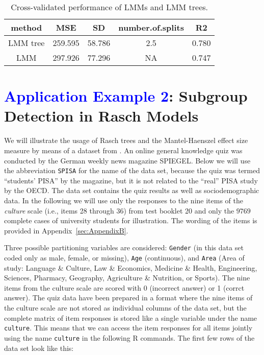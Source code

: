 \documentclass[doc,floatsintext,natbib]{apa7}
\newcommand{\edc}[1]{\textcolor{blue}{#1}}
\begin{document}
\begin{table}

\caption{\label{tab:performance}Cross-validated performance of LMMs and LMM trees.}
\begin{tabular}[t]{ccccc}
\toprule
method & MSE & SD & number.of.splits & R2\\
\midrule
LMM tree & 259.595 & 58.786 & 2.5 & 0.780\\
LMM & 297.926 & 77.296 & NA & 0.747\\
\bottomrule
\end{tabular}
\end{table}



\newpage
\FloatBarrier
\section{\edc{Application Example 2}: Subgroup Detection in Rasch Models}
\label{sec:TutorialRasch}


We will illustrate the usage of Rasch trees and the Mantel-Haenszel effect size measure by means of a dataset from \citet{SPISA:book}. An online general knowledge quiz was conducted by the German
weekly news magazine SPIEGEL. Below we will use the abbreviation \texttt{SPISA} for the name of the data set, because the quiz was termed ``students' PISA'' by the magazine, but it is not related to the ``real'' PISA study by the OECD. The data set contains the quiz results as well as
sociodemographic data. In the following we will use only the responses to the nine items of the \textit{culture} scale (i.e., items 28 through 36) from test booklet 20 and only the $9769$ complete cases of university students for illustration. The wording of the items is provided in Appendix~\ref{sec:AppendixB}. 

Three possible partitioning variables are considered: \texttt{Gender} (in this data set coded only as male, female, or missing), \texttt{Age} (continuous), and \texttt{Area} (Area of study: Language \& Culture, Law \& Economics, Medicine \& Health, Engineering, Sciences, Pharmacy, Geography, Agriculture \& Nutrition, or Sports). The nine items from the culture scale are scored with 0 (incorrect answer) or 1 (corrct answer). 
The quiz data have been prepared in a format where the nine items of the culture scale are not stored as individual columns of the data set, but the complete matrix of item responses is stored like a single variable \citep[see][]{raschtree:vignette} under the name \texttt{culture}. This means that we can access the item responses for all items jointly using the name \texttt{culture} in the following R commands. The first few rows of the data set look like this:
\end{document}

